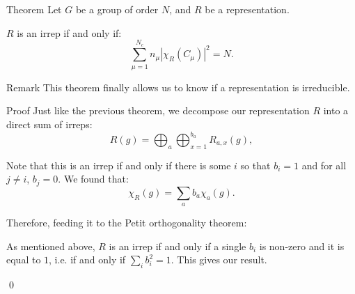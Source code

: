 \documentclass[a4paper]{article}
\begin{document}
\begin{parag}{Theorem}
    Let $G$ be a group of order $N$, and $R$ be a representation.

    $R$ is an irrep if and only if:
    \[\sum_{\mu=1}^{N_c} n_{\mu} \left|\chi_R\left(C_{\mu}\right)\right|^2 = N.\]

    \begin{subparag}{Remark}
        This theorem finally allows us to know if a representation is irreducible.
    \end{subparag}

    \begin{subparag}{Proof}
        Just like the previous theorem, we decompose our representation $R$ into a direct sum of irreps:
        \[R\left(g\right) = \bigoplus_{a} \bigoplus_{x=1}^{b_a} R_{a, x}\left(g\right),\]

        Note that this is an irrep if and only if there is some $i$ so that $b_i = 1$ and for all $j \neq i$, $b_j = 0$.  We found that: 
        \[\chi_R\left(g\right) = \sum_{a} b_a \chi_a\left(g\right).\]

        Therefore, feeding it to the Petit orthogonality theorem:

        As mentioned above, $R$ is an irrep if and only if a single $b_i$ is non-zero and it is equal to $1$, i.e. if and only if $\sum_{i} b_i^2 = 1$. This gives our result.

        \qed
    \end{subparag}
\end{parag}
\end{document}

